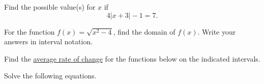 \begin{questions}
\newpage
\question[6] Find the possible value(s) for $x$ if $$4|x+3|-1 = 7.$$

\vfill
\question[6] For the function $f(x)=\sqrt{x^2-4}$, find the domain of $f(x)$. Write your answers in interval notation.

\vfill
\newpage



\question Find the \underline{average rate of change} for the functions below on the indicated intervals.
\newpage

\question Solve the following equations.%
\end{questions}